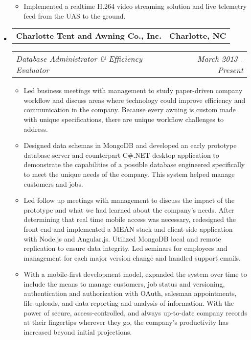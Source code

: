 \documentclass[10pt,letterpaper]{article}
\makeatletter
\newcommand{\headerrow}[2]
{\begin{tabular*}{\linewidth}{l@{\extracolsep{\fill}}r}
	#1 & #2 \\
\end{tabular*}}
\makeatother
\begin{document}
\begin{itemize}
\begin{itemize}
        \item Implemented a realtime H.264 video streaming solution and live
            telemetry feed from the UAS to the ground.
    \end{itemize}

	\item
	\headerrow
		{\textbf{Charlotte Tent and Awning Co., Inc.}}
		{\textbf{Charlotte, NC}}
	\headerrow
		{\emph{Database Administrator \& Efficiency Evaluator}}
        {\emph{March 2013 - Present}}
	\begin{itemize}
        \item Led business meetings with management to study paper-driven
            company workflow and discuss areas where technology could improve
            efficiency and communication in the company.  Because every awning
            is custom made with unique specifications, there are unique
            workflow challenges to address.

        \item Designed data schemas in MongoDB and developed an early prototype
            database server and counterpart C\#.NET desktop application to
            demonstrate the capabilities of a possible database engineered
            specifically to meet the unique needs of the company.  This system
            helped manage customers and jobs.

        \item Led follow up meetings with management to discuss the impact of
            the prototype and what we had learned about the company's needs.
            After determining that real time mobile access was necessary,
            redesigned the front end and implemented a MEAN stack and
            client-side application with Node.js and Angular.js.  Utilized
            MongoDB local and remote replication to ensure data integrity.  Led
            seminars for employees and management for each major version change
            and handled support emails.

        \item With a mobile-first development model, expanded the system over
            time to include the means to manage customers, job status and
            versioning, authentication and authorization with OAuth, salesman
            appointments, file uploads, and data reporting and analysis of
            information.  With the power of secure, access-controlled, and
            always up-to-date company records at their fingertips wherever they
            go, the company's productivity has increased beyond initial
            projections.
	\end{itemize}


\end{itemize}
\end{document}
